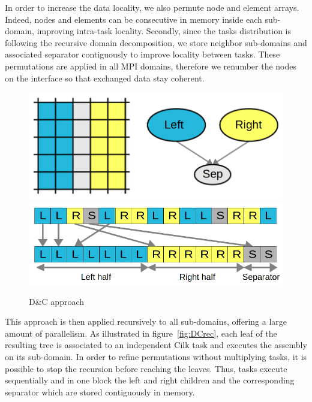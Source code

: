\documentclass{IOS-Book-Article}
\begin{document}
In order to increase the data locality, we also permute node and element arrays.
Indeed, nodes and elements can be consecutive in memory inside each sub-domain, improving intra-task locality.
Secondly, since the tasks distribution is following the recursive domain decomposition, we store neighbor sub-domains and associated separator contiguously
to improve locality between tasks.
These permutations are applied in all MPI domains, therefore we renumber the nodes on the interface so that exchanged data stay coherent.
\begin{figure}[htp]
 \centering
 \includegraphics[scale=0.17]{DC_approach.png}
 \includegraphics[scale=0.21]{Data_permutations.png}
 \caption{D\&C approach}
 \label{fig:DCapp}
\end{figure}

This approach is then applied recursively to all sub-domains, offering a large amount of parallelism.
As illustrated in figure~\ref{fig:DCrec}, each leaf of the resulting tree is associated to an independent Cilk task and executes the assembly on its sub-domain.
In order to refine permutations without multiplying tasks, it is possible to stop the recursion before reaching the leaves.
Thus, tasks execute sequentially and in one block the left and right children and the corresponding separator which are stored contiguously in memory.
\end{document}
